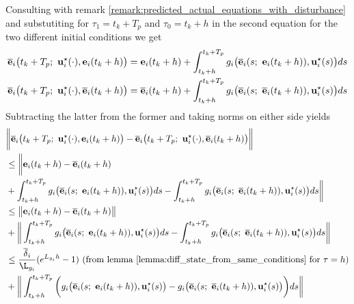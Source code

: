 \begin{gg_box}
Consulting with remark \eqref{remark:predicted_actual_equations_with_disturbance}
and substutiting for $\tau_1 = t_k + T_p$ and $\tau_0 = t_k +h$ in the second
equation for the two different initial conditions we get
\begin{align}
  \overline{\bm{\mathbf{e}}}_i\big(t_k + T_p;\ \bm{\mathbf{u}}_i^{\star}(\cdot), \bm{\mathbf{e}}_i(t_k +h)\big) &=
    \bm{\mathbf{e}}_i(t_k +h) + \int_{t_k +h}^{t_k + T_p} g_i\big(\overline{\bm{\mathbf{e}}}_i(s;\ \bm{\mathbf{e}}_i(t_k + h)), \bm{\mathbf{u}}_i^{\star}(s)\big) ds \\
  \overline{\bm{\mathbf{e}}}_i\big(t_k + T_p;\ \bm{\mathbf{u}}_i^{\star}(\cdot), \overline{\bm{\mathbf{e}}}_i(t_k +h)\big) &=
    \overline{\bm{\mathbf{e}}}_i(t_k +h) + \int_{t_k +h}^{t_k + T_p} g_i\big(\overline{\bm{\mathbf{e}}}_i(s;\ \overline{\bm{\mathbf{e}}}_i(t_k + h)), \bm{\mathbf{u}}_i^{\star}(s)\big) ds
\end{align}
Subtracting the latter from the former and taking norms on either side yields
\begin{align}
  &\bigg\| \overline{\vect{e}}_i\big(t_k + T_p;\ \vect{u}_i^{\star}(\cdot), \vect{e}_i(t_k +h)\big) -
    \overline{\vect{e}}_i\big(t_k + T_p;\ \vect{u}_i^{\star}(\cdot), \overline{\vect{e}}_i(t_k +h)\big) \bigg\| \\
  &\leq \bigg \| \vect{e}_i(t_k +h) - \overline{\vect{e}}_i(t_k +h) \\
  &+ \int_{t_k +h}^{t_k + T_p} g_i\big(\overline{\vect{e}}_i(s;\ \vect{e}_i(t_k + h)), \vect{u}_i^{\star}(s)\big) ds
    - \int_{t_k +h}^{t_k + T_p} g_i\big(\overline{\vect{e}}_i(s;\ \overline{\vect{e}}_i(t_k + h)), \vect{u}_i^{\star}(s)\big) ds\bigg\| \\
  &\leq \big \| \vect{e}_i(t_k +h) - \overline{\vect{e}}_i(t_k +h) \big \| \\
  &+ \bigg\| \int_{t_k +h}^{t_k + T_p} g_i\big(\overline{\vect{e}}_i(s;\ \vect{e}_i(t_k + h)), \vect{u}_i^{\star}(s)\big) ds
    - \int_{t_k +h}^{t_k + T_p} g_i\big(\overline{\vect{e}}_i(s;\ \overline{\vect{e}}_i(t_k + h)), \vect{u}_i^{\star}(s)\big) ds\bigg\| \\
  &\leq \dfrac{\overline{\delta}_i}{\L_{g_i}} (e^{L_{g_i} h} - 1) \text{ (from lemma \eqref{lemma:diff_state_from_same_conditions} for } \tau = h \text{)} \\
  &+ \bigg\| \int_{t_k +h}^{t_k + T_p} \bigg( g_i\big(\overline{\vect{e}}_i(s;\ \vect{e}_i(t_k + h)), \vect{u}_i^{\star}(s)\big)
    - g_i\big(\overline{\vect{e}}_i(s;\ \overline{\vect{e}}_i(t_k + h)), \vect{u}_i^{\star}(s)\big) \bigg)ds\bigg\| \\

\end{align}
\end{gg_box}
